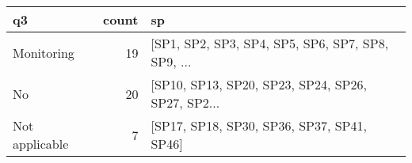 \begin{tabular}{lrl}
\toprule
             q3 &  count &                                                 sp \\
\midrule
     Monitoring &     19 &  [SP1, SP2, SP3, SP4, SP5, SP6, SP7, SP8, SP9, ... \\
             No &     20 &  [SP10, SP13, SP20, SP23, SP24, SP26, SP27, SP2... \\
 Not applicable &      7 &         [SP17, SP18, SP30, SP36, SP37, SP41, SP46] \\
\bottomrule
\end{tabular}
